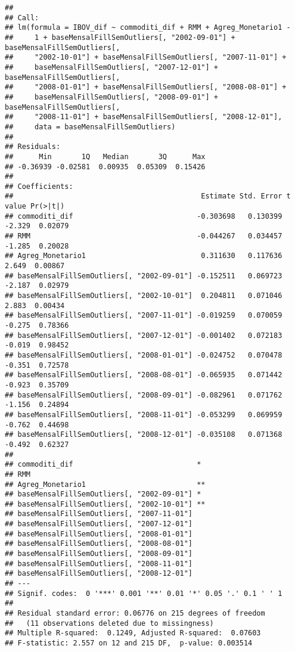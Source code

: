 \documentclass[
]{article}
\begin{document}
\begin{verbatim}
## 
## Call:
## lm(formula = IBOV_dif ~ commoditi_dif + RMM + Agreg_Monetario1 - 
##     1 + baseMensalFillSemOutliers[, "2002-09-01"] + baseMensalFillSemOutliers[, 
##     "2002-10-01"] + baseMensalFillSemOutliers[, "2007-11-01"] + 
##     baseMensalFillSemOutliers[, "2007-12-01"] + baseMensalFillSemOutliers[, 
##     "2008-01-01"] + baseMensalFillSemOutliers[, "2008-08-01"] + 
##     baseMensalFillSemOutliers[, "2008-09-01"] + baseMensalFillSemOutliers[, 
##     "2008-11-01"] + baseMensalFillSemOutliers[, "2008-12-01"], 
##     data = baseMensalFillSemOutliers)
## 
## Residuals:
##      Min       1Q   Median       3Q      Max 
## -0.36939 -0.02581  0.00935  0.05309  0.15426 
## 
## Coefficients:
##                                            Estimate Std. Error t value Pr(>|t|)
## commoditi_dif                             -0.303698   0.130399  -2.329  0.02079
## RMM                                       -0.044267   0.034457  -1.285  0.20028
## Agreg_Monetario1                           0.311630   0.117636   2.649  0.00867
## baseMensalFillSemOutliers[, "2002-09-01"] -0.152511   0.069723  -2.187  0.02979
## baseMensalFillSemOutliers[, "2002-10-01"]  0.204811   0.071046   2.883  0.00434
## baseMensalFillSemOutliers[, "2007-11-01"] -0.019259   0.070059  -0.275  0.78366
## baseMensalFillSemOutliers[, "2007-12-01"] -0.001402   0.072183  -0.019  0.98452
## baseMensalFillSemOutliers[, "2008-01-01"] -0.024752   0.070478  -0.351  0.72578
## baseMensalFillSemOutliers[, "2008-08-01"] -0.065935   0.071442  -0.923  0.35709
## baseMensalFillSemOutliers[, "2008-09-01"] -0.082961   0.071762  -1.156  0.24894
## baseMensalFillSemOutliers[, "2008-11-01"] -0.053299   0.069959  -0.762  0.44698
## baseMensalFillSemOutliers[, "2008-12-01"] -0.035108   0.071368  -0.492  0.62327
##                                             
## commoditi_dif                             * 
## RMM                                         
## Agreg_Monetario1                          **
## baseMensalFillSemOutliers[, "2002-09-01"] * 
## baseMensalFillSemOutliers[, "2002-10-01"] **
## baseMensalFillSemOutliers[, "2007-11-01"]   
## baseMensalFillSemOutliers[, "2007-12-01"]   
## baseMensalFillSemOutliers[, "2008-01-01"]   
## baseMensalFillSemOutliers[, "2008-08-01"]   
## baseMensalFillSemOutliers[, "2008-09-01"]   
## baseMensalFillSemOutliers[, "2008-11-01"]   
## baseMensalFillSemOutliers[, "2008-12-01"]   
## ---
## Signif. codes:  0 '***' 0.001 '**' 0.01 '*' 0.05 '.' 0.1 ' ' 1
## 
## Residual standard error: 0.06776 on 215 degrees of freedom
##   (11 observations deleted due to missingness)
## Multiple R-squared:  0.1249, Adjusted R-squared:  0.07603 
## F-statistic: 2.557 on 12 and 215 DF,  p-value: 0.003514
\end{verbatim}
\end{document}
